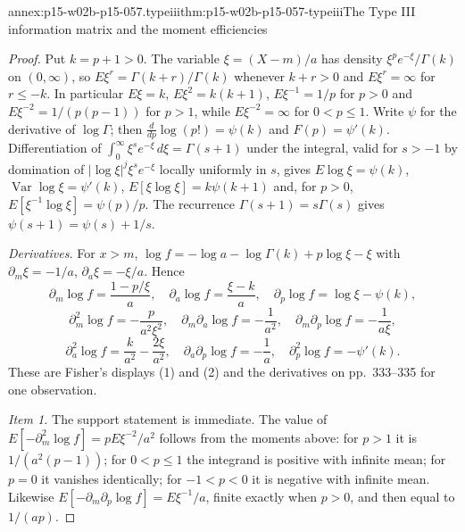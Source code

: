 \begin{annexitem}{annex:p15-w02b-p15-057.typeiii}{thm:p15-w02b-p15-057-typeiii}{The Type III information matrix and the moment efficiencies}
\begin{proof}
Put \(k=p+1>0\). The variable \(\xi=(X-m)/a\) has density
\(\xi^{p}e^{-\xi}/\Gamma(k)\) on \((0,\infty)\), so
\(E\xi^r=\Gamma(k+r)/\Gamma(k)\) whenever \(k+r>0\) and
\(E\xi^r=\infty\) for \(r\leq-k\). In particular \(E\xi=k\),
\(E\xi^2=k(k+1)\), \(E\xi^{-1}=1/p\) for \(p>0\) and
\(E\xi^{-2}=1/(p(p-1))\) for \(p>1\), while \(E\xi^{-2}=\infty\) for
\(0<p\leq1\). Write \(\psi\) for the derivative of \(\log\Gamma\); then
\(\frac{d}{dp}\log(p!)=\psi(k)\) and \(F(p)=\psi'(k)\). Differentiation of
\(\int_0^\infty\xi^{s}e^{-\xi}\,d\xi=\Gamma(s+1)\) under the integral, valid
for \(s>-1\) by domination of \(|\log\xi|^j\xi^{s}e^{-\xi}\) locally
uniformly in \(s\), gives \(E\log\xi=\psi(k)\),
\(\operatorname{Var}\log\xi=\psi'(k)\), \(E[\xi\log\xi]=k\psi(k+1)\) and,
for \(p>0\), \(E[\xi^{-1}\log\xi]=\psi(p)/p\). The recurrence
\(\Gamma(s+1)=s\Gamma(s)\) gives \(\psi(s+1)=\psi(s)+1/s\).

\emph{Derivatives.} For \(x>m\),
\(\log f=-\log a-\log\Gamma(k)+p\log\xi-\xi\) with
\(\partial_m\xi=-1/a\), \(\partial_a\xi=-\xi/a\). Hence
\[
 \partial_m\log f=\frac{1-p/\xi}{a},\quad
 \partial_a\log f=\frac{\xi-k}{a},\quad
 \partial_p\log f=\log\xi-\psi(k),
\]
\[
 \partial_m^2\log f=-\frac{p}{a^2\xi^2},\quad
 \partial_m\partial_a\log f=-\frac1{a^2},\quad
 \partial_m\partial_p\log f=-\frac1{a\xi},
\]
\[
 \partial_a^2\log f=\frac{k}{a^2}-\frac{2\xi}{a^2},\quad
 \partial_a\partial_p\log f=-\frac1a,\quad
 \partial_p^2\log f=-\psi'(k).
\]
These are Fisher's displays (1) and (2) and the derivatives on pp.~333--335
for one observation.

\emph{Item 1.} The support statement is immediate. The value of
\(E[-\partial_m^2\log f]=pE\xi^{-2}/a^2\) follows from the moments above:
for \(p>1\) it is \(1/(a^2(p-1))\); for \(0<p\leq1\) the integrand is
positive with infinite mean; for \(p=0\) it vanishes identically; for
\(-1<p<0\) it is negative with infinite mean. Likewise
\(E[-\partial_m\partial_p\log f]=E\xi^{-1}/a\), finite exactly when
\(p>0\), and then equal to \(1/(ap)\).


\end{proof}
\end{annexitem}
